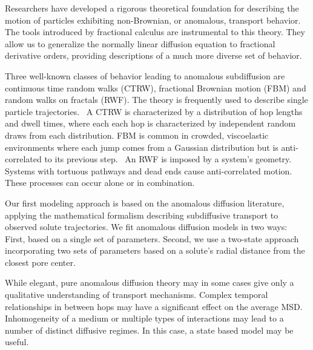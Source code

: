 \documentclass{article}
\begin{document}
  Researchers have developed a rigorous theoretical foundation for describing the 
  motion of particles exhibiting non-Brownian, or anomalous, transport behavior.
  The tools introduced by fractional calculus are instrumental to this theory. They
  allow us to generalize the normally linear diffusion equation to fractional
  derivative orders, providing descriptions of a much more diverse set of behavior.~\cite{klages_anomalous_2008}

  Three well-known classes of behavior leading to anomalous subdiffusion are 
  continuous time random walks (CTRW), fractional Brownian motion
  (FBM) and random walks on fractals (RWF).\cite{meroz_toolbox_2015}
  The theory is frequently used to describe single particle trajectories.~\cite{morrin_three_2018,metzler_anomalous_2014}
  A CTRW is characterized by a distribution of hop lengths and dwell times, 
  where each each hop is characterized by independent random draws from 
  each distribution.\cite{montroll_random_1965} FBM is common in crowded,
  viscoelastic environments where each jump comes from a Gaussian distribution
  but is anti-correlated to its previous step.~\cite{mandelbrot_fractional_1968,jeon_fractional_2010,banks_anomalous_2005}
  An RWF is imposed by a system's geometry. Systems with tortuous pathways 
  and dead ends cause anti-correlated motion.\cite{meroz_toolbox_2015,neusius_subdiffusion_2008}
  These processes can occur alone or in combination.

  
  Our first modeling approach is based on the anomalous diffusion literature, 
  applying the mathematical formalism describing subdiffusive transport to observed
  solute trajectories. We fit anomalous diffusion models in two ways: First, based 
  on a single set of parameters. Second, we use a two-state approach incorporating
  two sets of parameters based on a solute's radial distance from the closest pore center. 
  
  While elegant, pure anomalous diffusion theory may in some cases give only a 
  qualitative understanding of transport mechanisms. Complex temporal relationships in 
  between hops may have a significant effect on the average MSD. Inhomogeneity of 
  a medium or multiple types of interactions may lead to a number of distinct 
  diffusive regimes. In this case, a state based model may be useful. 
  
\end{document}
